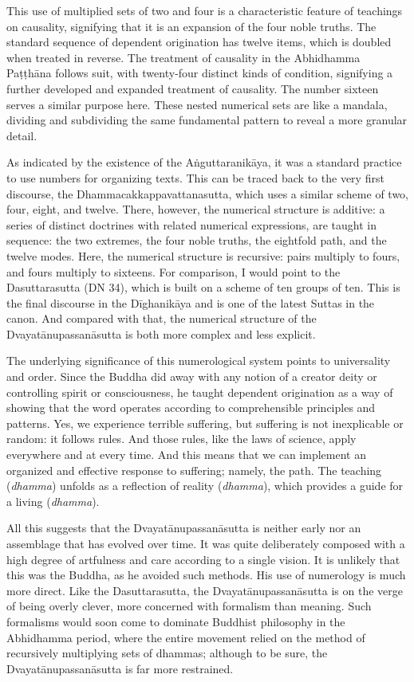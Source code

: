 \documentclass[12pt,openany]{book}%
\begin{document}
This use of multiplied sets of two and four is a characteristic feature of teachings on causality, signifying that it is an expansion of the four noble truths. The standard sequence of dependent origination has twelve items, which is doubled when treated in reverse. The treatment of causality in the Abhidhamma \textsanskrit{Paṭṭhāna} follows suit, with twenty-four distinct kinds of condition, signifying a further developed and expanded treatment of causality. The number sixteen serves a similar purpose here. These nested numerical sets are like a mandala, dividing and subdividing the same fundamental pattern to reveal a more granular detail.

As indicated by the existence of the \textsanskrit{Aṅguttaranikāya}, it was a standard practice to use numbers for organizing texts. This can be traced back to the very first discourse, the Dhammacakkappavattanasutta, which uses a similar scheme of two, four, eight, and twelve. There, however, the numerical structure is additive: a series of distinct doctrines with related numerical expressions, are taught in sequence: the two extremes, the four noble truths, the eightfold path, and the twelve modes. Here, the numerical structure is recursive: pairs multiply to fours, and fours multiply to sixteens. For comparison, I would point to the Dasuttarasutta (DN 34), which is built on a scheme of ten groups of ten. This is the final discourse in the \textsanskrit{Dīghanikāya} and is one of the latest Suttas in the canon. And compared with that, the numerical structure of the \textsanskrit{Dvayatānupassanāsutta} is both more complex and less explicit.

The underlying significance of this numerological system points to universality and order. Since the Buddha did away with any notion of a creator deity or controlling spirit or consciousness, he taught dependent origination as a way of showing that the word operates according to comprehensible principles and patterns. Yes, we experience terrible suffering, but suffering is not inexplicable or random: it follows rules. And those rules, like the laws of science, apply everywhere and at every time. And this means that we can implement an organized and effective response to suffering; namely, the path. The teaching (\textit{dhamma}) unfolds as a reflection of reality (\textit{dhamma}), which provides a guide for a living (\textit{dhamma}).

All this suggests that the \textsanskrit{Dvayatānupassanāsutta} is neither early nor an assemblage that has evolved over time. It was quite deliberately composed with a high degree of artfulness and care according to a single vision. It is unlikely that this was the Buddha, as he avoided such methods. His use of numerology is much more direct. Like the Dasuttarasutta, the \textsanskrit{Dvayatānupassanāsutta} is on the verge of being overly clever, more concerned with formalism than meaning. Such formalisms would soon come to dominate Buddhist philosophy in the Abhidhamma period, where the entire movement relied on the method of recursively multiplying sets of dhammas; although to be sure, the \textsanskrit{Dvayatānupassanāsutta} is far more restrained.
\end{document}
